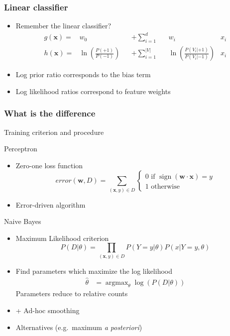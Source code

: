\documentclass[14pt,mathserif,dvipsnames,usenames]{beamer}
\DeclareMathOperator*{\argmax}{argmax}
\DeclareMathOperator*{\sign}{sign}
\newcommand{\x}{\mathbf{x}}
\newcommand{\w}{\mathbf{w}}
\begin{document}
\begin{frame}
  \frametitle{Linear classifier}
  \begin{itemize}
  \item Remember the linear classifier?
    \begin{align}\nonumber
      g(\x) = & w_0               &  & + \sum_{i=1}^d      && w_i 
                            & x_i \\\nonumber
      h(\x) = &  \ln\left(\frac{P(+1)}{P(-1)}\right)      &  & + \sum_{i=1}^{|V|}  &&  \ln\left(\frac{P(V_i|+1)}{P(V_i|-1)}\right)
                            & x_i 
    \end{align} 
  \item Log prior ratio corresponds to the bias term
  \item Log likelihood ratios correspond to feature weights
  \end{itemize}
\end{frame}


\begin{frame}
  \frametitle{What is the difference}
  Training criterion and procedure
  \begin{block}{Perceptron}
    \begin{itemize}
    \item Zero-one loss function    
      \[
      \mathit{error}(\w,D) = \sum_{(\x,y) \in D}
      \begin{cases}
        0 \text{ if } \sign(\w \cdot \x) = y\\
        1 \text{ otherwise }
      \end{cases}
      \]
    \item Error-driven algorithm
    \end{itemize}
  \end{block}
\end{frame}

\begin{frame}
  \begin{block}{ Naive Bayes}
    \begin{itemize}
  \item Maximum Likelihood criterion 
    \[
    P(D|\theta) = \prod_{(\x,y) \in D} P(Y=y|\theta)P(x|Y=y,\theta)
    \]
  \item Find parameters which maximize the log likelihood
    \begin{align}\nonumber
    \hat{\theta} & = \argmax_{\theta} \log(P(D|\theta))
    \end{align}
    Parameters reduce to relative counts
  \item + Ad-hoc smoothing
  \item Alternatives (e.g.\ maximum {\it a posteriori})
  \end{itemize}
\end{block}
\end{frame}
\end{document}
